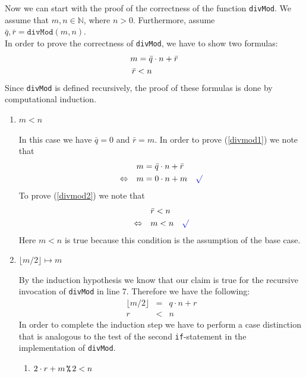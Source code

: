 Now we can start with the proof of the correctness of the function \texttt{divMod}. We assume
that $m,n \in\mathbb{N}$, where $n > 0$.  Furthermore, assume 
\\[0.2cm]
\hspace*{1.3cm}
$\bar{q}, \bar{r} = \mathtt{divMod}(m, n)$.
\\[0.2cm] 
In order to prove the correctness of \texttt{divMod}, we have to show two formulas:
\begin{align}
m = \bar{q} \cdot n + \bar{r} \label{divmod1} \\
\bar{r} < n \hspace*{1.1cm} \label{divmod2}
\end{align}
Since \texttt{divMod} is defined recursively, the proof of these formulas is done by computational induction.
\begin{enumerate}
\item[B.C.:] $m < n$

  In this case we have $\bar{q} = 0$ and $\bar{r} = m$.
  In order to prove (\ref{divmod1}) we note that 
  \begin{align*}
                    & m = \bar{q} \cdot n + \bar{r} \\
    \Leftrightarrow\quad & m = 0 \cdot n + m \quad \green{\surd}
  \end{align*}
  To prove (\ref{divmod2}) we note that
  \begin{align*}
                         & \bar{r} < n \\
    \Leftrightarrow\quad & m < n \quad\green{\surd}
  \end{align*}
  Here $m < n$ is true because this condition is the assumption of the base case.
\item[I.S.:] $\lfloor m / 2 \rfloor \mapsto m$

  By the induction hypothesis we know that our claim is true for the recursive invocation of \texttt{divMod} in
  line 7.  Therefore we have the following:
  \begin{eqnarray}
    \lfloor m / 2 \rfloor &\!=\! & q \cdot n + r \label{divmod3} \\
                        r &\!<\! & n             \label{divmod4}
  \end{eqnarray}
  In order to complete the induction step we have to perform a case distinction that is analogous to the test
  of the second \texttt{if}-statement in the implementation of \texttt{divMod}.
  \begin{enumerate}
  \item $2 \cdot r + m \,\texttt{\%}\, 2 < n$


\end{enumerate}
\end{enumerate}
